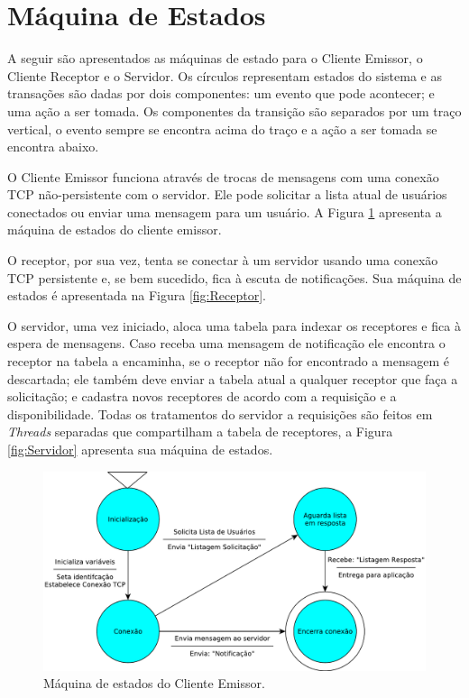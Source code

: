 \documentclass[12pt]{article}
\begin{document}
\section{Máquina de Estados}\label{sec:MaquinaDeEstados}

A seguir são apresentados as máquinas de estado para o
Cliente Emissor,
o Cliente Receptor e
o Servidor.
Os círculos representam estados do sistema e
as transações são dadas por dois componentes:
um evento que pode acontecer;
e uma ação a ser tomada.
Os componentes da transição são separados por um traço vertical,
o evento sempre se encontra acima do traço e
a ação a ser tomada se encontra abaixo.

O Cliente Emissor funciona através de trocas de mensagens com uma conexão TCP não-persistente com o servidor.
Ele pode solicitar a lista atual de usuários conectados ou enviar uma mensagem para um usuário.
A Figura \ref{fig:Emissor} apresenta a máquina de estados do cliente emissor.

O receptor, por sua vez, tenta se conectar à um servidor usando uma conexão TCP persistente e,
se bem sucedido,
fica à escuta de notificações.
Sua máquina de estados é apresentada na Figura \ref{fig:Receptor}.

O servidor, uma vez iniciado,
aloca uma tabela para indexar os receptores e fica à espera de mensagens.
Caso receba uma mensagem de notificação ele encontra o receptor na tabela a encaminha,
se o receptor não for encontrado a mensagem é descartada;
ele também deve enviar a tabela atual a qualquer receptor que faça a solicitação;
e cadastra novos receptores de acordo com a requisição e a disponibilidade.
Todas os tratamentos do servidor a requisições são feitos em {\it Threads} separadas que compartilham a tabela de receptores,
a Figura \ref{fig:Servidor} apresenta sua máquina de estados.

\begin{figure}%
	\centering
	\includegraphics[width=1\textwidth]{images/Protocolo_Cliente_Emissor.pdf}
	\caption{Máquina de estados do Cliente Emissor.}
	\label{fig:Emissor}
\end{figure}
\end{document}
